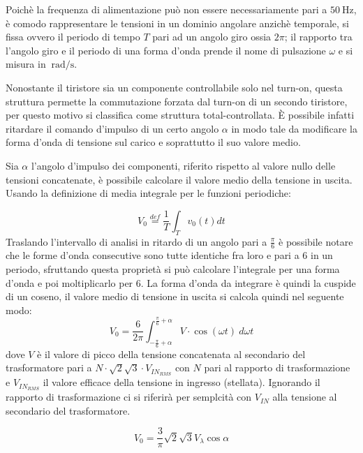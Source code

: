\documentclass[a4paper,10pt]{article}
\begin{document}
Poichè la frequenza di alimentazione può non essere necessariamente pari a 
$\SI{50}{\hertz}$, è comodo rappresentare le tensioni in un dominio angolare anzichè 
temporale, si fissa ovvero il periodo di tempo \(T\) pari ad un angolo giro ossia 
\(2\pi\); il rapporto tra l'angolo giro e il periodo di una forma d'onda prende il
nome di pulsazione \(\omega\) e si misura in $\SI{}{\radian\per\second}$.
\smallskip

Nonostante il tiristore sia un componente controllabile solo nel turn-on, questa 
struttura permette la commutazione forzata dal turn-on di un secondo tiristore,
per questo motivo si classifica come struttura total-controllata.
È possibile infatti ritardare il comando d'impulso di un certo angolo \(\alpha\) in
modo tale da modificare la forma d'onda di tensione sul carico e soprattutto il suo valore medio.

Sia \(\alpha\) l'angolo d'impulso dei componenti, riferito rispetto al valore nullo
delle tensioni concatenate, è possibile calcolare il valore medio della tensione in uscita.
Usando la definizione di media integrale per le funzioni periodiche:

\begin{equation}
 V_0 \stackrel{def}{=} \frac{1}{T}\int_T v_0(t) dt
 \label{eq:def_media_integrale}
\end{equation}
Traslando l'intervallo di analisi in ritardo di un angolo pari a \(\frac{\pi}{6}\) 
è possibile notare che le forme d'onda consecutive sono tutte identiche fra loro e pari %
a 6 in un periodo, sfruttando questa proprietà si può calcolare l'integrale per una forma d'onda e poi moltiplicarlo per 6.
La forma d'onda da integrare è quindi la cuspide di un coseno, il valore medio di 
tensione in uscita si calcola quindi nel seguente modo:
\begin{equation}
 V_0 = \frac{6}{2\pi} \int_{-\frac{\pi}{6}+\alpha}^{\frac{\pi}{6}+\alpha}
 V\cdot \cos (\omega t)\ d\omega t
\end{equation}
dove \(V\) è il valore di picco della tensione concatenata al secondario del trasformatore
pari a \(N\cdot\sqrt2\sqrt3\cdot V_{IN_{RMS}} \) con \(N\) pari al rapporto di trasformazione
e \(V_{IN_{RMS}} \) il valore efficace della tensione in ingresso (stellata).
Ignorando il rapporto di trasformazione ci si riferirà per semplcità con \(V_{IN}\)
alla tensione al secondario del trasformatore.

\begin{equation}
 V_0 = \frac{3}{\pi} \sqrt{2} \sqrt{3} V_\lambda \cos\alpha
 \label{eq:valore_medio_tensione_ponte}
\end{equation}
\end{document}
